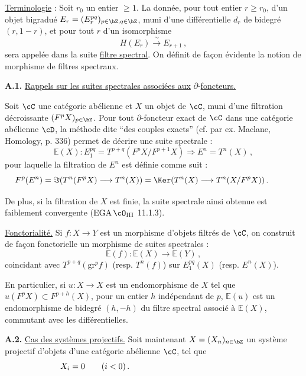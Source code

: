\smallskip

\underline{Terminologie} : Soit $r_0$ un entier $\geq 1$. La donn\'ee, pour tout entier $r \geq r_0$, d'un objet bigradu\'e $E_r = (E_r^{pq})_{p \in \bZ, q \in \bZ}$, muni d'une diff\'erentielle $d_r$ de bidegr\'e $(r, 1-r)$, et pour tout $r$ d'un isomorphisme
\[
H(E_r) \xrightarrow{\;\sim\;} E_{r+1}\,,
\]
sera appel\'ee dans la suite \underline{filtre spectral}. On d\'efinit de fa\c con \'evidente la notion de morphisme de filtres spectraux.

\bigskip

\noindent
\textbf{A.1.} \underline{Rappels sur les suites spectrales associ\'ees aux} $\partial$-\underline{foncteurs.}

Soit $\cC$ une cat\'egorie ab\'elienne et $X$ un objet de $\cC$, muni d'une filtration d\'ecroissante $(F^p X)_{p \in \bZ}$. Pour tout $\partial$-foncteur exact de $\cC$ dans une cat\'egorie ab\'elienne $\cD$, la m\'ethode dite ``des couples exacts'' (cf. par ex. Maclane, Homology, p. 336) permet de d\'ecrire une suite spectrale :
\[
\mathbb{E}(X) : E_1^{pq} = T^{p+q}(F^p X / F^{p+1} X) \Rightarrow E^n = T^n(X)\,,
\]
pour laquelle la filtration de $E^n$ est d\'efinie comme suit :
\[
F^p(E^n) = \Im(T^n(F^p X) \longrightarrow T^n(X)) = \Ker(T^n(X) \longrightarrow T^n(X/F^p X))\,.\hspace*{1cm}
\]

De plus, si la filtration de $X$ est finie, la suite spectrale ainsi obtenue est faiblement convergente ($\mathrm{EGA}\,\cO_{\mathrm{III}}$ 11.1.3).

\newpage

\noindent
\underline{Fonctorialit\'e.} Si $f : X \rightarrow Y$ est un morphisme d'objets filtr\'es de $\cC$, on construit de fa\c con fonctorielle un morphisme de suites spectrales :
\[
\mathbb{E}(f) : \mathbb{E}(X) \longrightarrow \mathbb{E}(Y)\,,
\]
coincidant avec $T^{p+q}(\mathrm{gr}^p f)$ (resp. $T^n(f)$) sur $E_1^{pq}(X)$ (resp. $E^n(X)$).

En particulier, si $u : X \rightarrow X$ est un endomorphisme de $X$ tel que $u(F^p X) \subset F^{p+h}(X)$, pour un entier $h$ ind\'ependant de $p$, $\mathbb{E}(u)$ est un endomorphisme de bidegr\'e $(h, -h)$ du filtre spectral associ\'e \`a $\mathbb{E}(X)$, commutant avec les diff\'erentielles.

\bigskip

\noindent
\textbf{A.2.} \underline{Cas des syst\`emes projectifs.} Soit maintenant $X = (X_n)_{n \in \bZ}$ un syst\`eme projectif d'objets d'une cat\'egorie ab\'elienne $\cC$, tel que
\[
X_i = 0 \qquad (i < 0)\,.\hspace*{5cm}
\]

